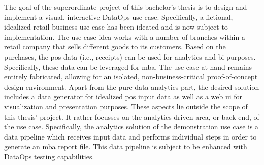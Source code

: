 The goal of the superordinate project of this bachelor's thesis is to design and implement a visual, interactive DataOps use case. Specifically, a fictional, idealized retail business use case has been ideated and is now subject to implementation. The use case idea works with a number of branches within a retail company that sells different goods to its customers. Based on the purchases, the \ac{pos} data (i.e., receipts) can be used for analytics and \ac{bi} purposes. Specifically, these data can be leveraged for \ac{mba}. The use case at hand remains entirely fabricated, allowing for an isolated, non-business-critical proof-of-concept design environment. Apart from the pure data analytics part, the desired solution includes a data generator for idealized \ac{pos} input data as well as a web \acs{ui} for visualization and presentation purposes. These aspects lie outside the scope of this thesis' project. It rather focusses on the analytics-driven area, or back end, of the use case. Specifically, the analytics solution of the demonstration use case is a data pipeline which receives input data and performs individual steps in order to generate an \ac{mba} report file. This data pipeline is subject to be enhanced with DataOps testing capabilities.